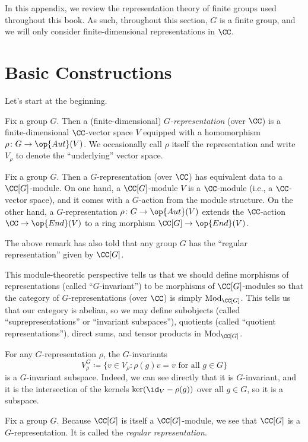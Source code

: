 \documentclass[../main.tex]{subfiles}
\begin{document}
In this appendix, we review the representation theory of finite groups used throughout this book. As such, throughout this section, $G$ is a finite group, and we will only consider finite-dimensional representations in $\CC$.

\section{Basic Constructions}
Let's start at the beginning.
\begin{definition}[representation]
	Fix a group $G$. Then a (finite-dimensional) \textit{$G$-representation} (over $\CC$) is a finite-dimensional $\CC$-vector space $V$ equipped with a homomorphism $\rho\colon G\to\op{Aut}(V)$. We occasionally call $\rho$ itself the representation and write $V_\rho$ to denote the ``underlying'' vector space.
\end{definition}
\begin{remark}
	Fix a group $G$. Then a $G$-representation (over $\CC$) has equivalent data to a $\CC[G]$-module. On one hand, a $\CC[G]$-module $V$ is a $\CC$-module (i.e., a $\CC$-vector space), and it comes with a $G$-action from the module structure. On the other hand, a $G$-representation $\rho\colon G\to\op{Aut}(V)$ extends the $\CC$-action $\CC\to\op{End}(V)$ to a ring morphism $\CC[G]\to\op{End}(V)$.
\end{remark}
\begin{example}
	The above remark has also told that any group $G$ has the ``regular representation'' given by $\CC[G]$.
\end{example}
This module-theoretic perspective tells us that we should define morphisms of representations (called ``$G$-invariant'') to be morphisms of $\CC[G]$-modules so that the category of $G$-representations (over $\CC$) is simply $\mathrm{Mod}_{\CC[G]}$. This tells us that our category is abelian, so we may define subobjects (called ``suprepresentations'' or ``invariant subspaces''), quotients (called ``quotient representations''), direct sums, and tensor products in $\mathrm{Mod}_{\CC[G]}$.
\begin{example}
	For any $G$-representation $\rho$, the $G$-invariants
	\[V^G_\rho\coloneqq\{v\in V_\rho:\rho(g)v=v\text{ for all }g\in G\}\]
	is a $G$-invariant subspace. Indeed, we can see directly that it is $G$-invariant, and it is the intersection of the kernels $\ker({\id_V}-\rho(g))$ over all $g\in G$, so it is a subspace.
\end{example}
\begin{definition}
	Fix a group $G$. Because $\CC[G]$ is itself a $\CC[G]$-module, we see that $\CC[G]$ is a $G$-representation. It is called the \textit{regular representation}.
\end{definition}
\end{document}
